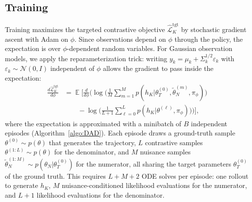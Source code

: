 \documentclass[conference]{IEEEtran}
\DeclareMathOperator{\E}{\mathbb{E}}
\begin{document}
\subsection{Training}
Training maximizes the targeted contrastive objective $\hat{\mathcal{L}}_K^{\text{tgt}}$ by stochastic gradient ascent with Adam on $\phi$. Since observations depend on $\phi$ through the policy, the expectation is over $\phi$-dependent random variables. For Gaussian observation models, we apply the reparameterization trick: writing $y_k = \mu_k + \Sigma_k^{1/2}\varepsilon_k$ with $\varepsilon_k \sim \mathcal{N}(0, I)$ independent of $\phi$ allows the gradient to pass inside the expectation:
\begin{equation}
\begin{aligned}
\frac{d\hat{\mathcal{L}}_K^{\text{tgt}}}{d\phi}
&= \E\Bigg[\frac{d}{d\phi}\Bigg(
\log\Big(\frac{1}{M}\sum_{m=1}^{M}
p(h_K|\theta_T^{(0)}, \tilde{\theta}_N^{(m)}, \pi_\phi)\Big)\\
&\qquad - \log\Big(\frac{1}{L+1}\sum_{\ell=0}^{L}
p(h_K|\theta^{(\ell)}, \pi_\phi)\Big)
\Bigg)\Bigg],
\end{aligned}
\end{equation}
where the expectation is approximated with a minibatch of $B$ independent episodes (Algorithm~\ref{algo:DAD}).
Each episode draws a ground-truth sample $\theta^{(0)} \sim p(\theta)$ that generates the trajectory, $L$ contrastive samples $\theta^{(1:L)} \sim p(\theta)$ for the denominator, and $M$ nuisance samples $\tilde{\theta}_N^{(1:M)} \sim p(\theta_N|\theta_T^{(0)})$ for the numerator, all sharing the target parameters $\theta_T^{(0)}$ of the ground truth. This requires $L + M + 2$ ODE solves per episode: one rollout to generate $h_K$, $M$ nuisance-conditioned likelihood evaluations for the numerator, and $L + 1$ likelihood evaluations for the denominator.
\end{document}
